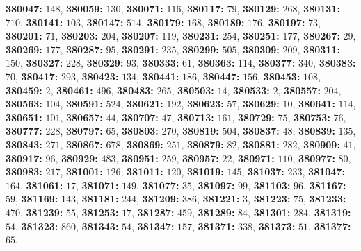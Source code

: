 \textsf{\bfseries 380047:} $148$, \textsf{\bfseries 380059:} $130$, \textsf{\bfseries 380071:} $116$, \textsf{\bfseries 380117:} $79$, \textsf{\bfseries 380129:} $268$, \textsf{\bfseries 380131:} $710$, \textsf{\bfseries 380141:} $103$, \textsf{\bfseries 380147:} $514$, \textsf{\bfseries 380179:} $168$, \textsf{\bfseries 380189:} $176$, \textsf{\bfseries 380197:} $73$, \textsf{\bfseries 380201:} $71$, \textsf{\bfseries 380203:} $204$, \textsf{\bfseries 380207:} $119$, \textsf{\bfseries 380231:} $254$, \textsf{\bfseries 380251:} $177$, \textsf{\bfseries 380267:} $29$, \textsf{\bfseries 380269:} $177$, \textsf{\bfseries 380287:} $95$, \textsf{\bfseries 380291:} $235$, \textsf{\bfseries 380299:} $505$, \textsf{\bfseries 380309:} $209$, \textsf{\bfseries 380311:} $150$, \textsf{\bfseries 380327:} $228$, \textsf{\bfseries 380329:} $93$, \textsf{\bfseries 380333:} $61$, \textsf{\bfseries 380363:} $114$, \textsf{\bfseries 380377:} $340$, \textsf{\bfseries 380383:} $70$, \textsf{\bfseries 380417:} $293$, \textsf{\bfseries 380423:} $134$, \textsf{\bfseries 380441:} $186$, \textsf{\bfseries 380447:} $156$, \textsf{\bfseries 380453:} $108$, \textsf{\bfseries 380459:} $2$, \textsf{\bfseries 380461:} $496$, \textsf{\bfseries 380483:} $265$, \textsf{\bfseries 380503:} $14$, \textsf{\bfseries 380533:} $2$, \textsf{\bfseries 380557:} $204$, \textsf{\bfseries 380563:} $104$, \textsf{\bfseries 380591:} $524$, \textsf{\bfseries 380621:} $192$, \textsf{\bfseries 380623:} $57$, \textsf{\bfseries 380629:} $10$, \textsf{\bfseries 380641:} $114$, \textsf{\bfseries 380651:} $101$, \textsf{\bfseries 380657:} $44$, \textsf{\bfseries 380707:} $47$, \textsf{\bfseries 380713:} $161$, \textsf{\bfseries 380729:} $75$, \textsf{\bfseries 380753:} $76$, \textsf{\bfseries 380777:} $228$, \textsf{\bfseries 380797:} $65$, \textsf{\bfseries 380803:} $270$, \textsf{\bfseries 380819:} $504$, \textsf{\bfseries 380837:} $48$, \textsf{\bfseries 380839:} $135$, \textsf{\bfseries 380843:} $271$, \textsf{\bfseries 380867:} $678$, \textsf{\bfseries 380869:} $251$, \textsf{\bfseries 380879:} $82$, \textsf{\bfseries 380881:} $282$, \textsf{\bfseries 380909:} $41$, \textsf{\bfseries 380917:} $96$, \textsf{\bfseries 380929:} $483$, \textsf{\bfseries 380951:} $259$, \textsf{\bfseries 380957:} $22$, \textsf{\bfseries 380971:} $110$, \textsf{\bfseries 380977:} $80$, \textsf{\bfseries 380983:} $217$, \textsf{\bfseries 381001:} $126$, \textsf{\bfseries 381011:} $120$, \textsf{\bfseries 381019:} $145$, \textsf{\bfseries 381037:} $233$, \textsf{\bfseries 381047:} $164$, \textsf{\bfseries 381061:} $17$, \textsf{\bfseries 381071:} $149$, \textsf{\bfseries 381077:} $35$, \textsf{\bfseries 381097:} $99$, \textsf{\bfseries 381103:} $96$, \textsf{\bfseries 381167:} $59$, \textsf{\bfseries 381169:} $143$, \textsf{\bfseries 381181:} $244$, \textsf{\bfseries 381209:} $386$, \textsf{\bfseries 381221:} $3$, \textsf{\bfseries 381223:} $75$, \textsf{\bfseries 381233:} $470$, \textsf{\bfseries 381239:} $55$, \textsf{\bfseries 381253:} $17$, \textsf{\bfseries 381287:} $459$, \textsf{\bfseries 381289:} $84$, \textsf{\bfseries 381301:} $284$, \textsf{\bfseries 381319:} $54$, \textsf{\bfseries 381323:} $860$, \textsf{\bfseries 381343:} $54$, \textsf{\bfseries 381347:} $157$, \textsf{\bfseries 381371:} $338$, \textsf{\bfseries 381373:} $51$, \textsf{\bfseries 381377:} $65$, 
